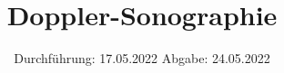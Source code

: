 

\subject{US3}
\title{Doppler-Sonographie}
\date{
  Durchführung: 17.05.2022
  \hspace{3em}
  Abgabe: 24.05.2022
}



\maketitle
\thispagestyle{empty}
\tableofcontents
\newpage








\printbibliography{}
\nocite{matplotlib}
\nocite{numpy}
\nocite{scipy}
\nocite{uncertainties}
\nocite{reback2020pandas}

% 


